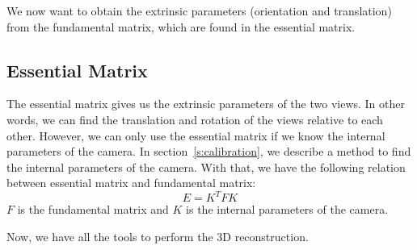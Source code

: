 We now want to obtain the extrinsic parameters (orientation and translation) from the fundamental matrix, which are found in the essential matrix.

\subsection{Essential Matrix}
The essential matrix gives us the extrinsic parameters of the two views. In other words, we can find the translation and rotation of the views relative to each other. However, we can only use the essential matrix if we know the internal parameters of the camera. In section~\ref{s:calibration}, we describe a method to find the internal parameters of the camera. With that, we have the following relation between essential matrix and fundamental matrix:
\begin{equation}
E = K^TFK
\end{equation}
$F$ is the fundamental matrix and $K$ is the internal parameters of the camera.

Now, we have all the tools to perform the 3D reconstruction.
